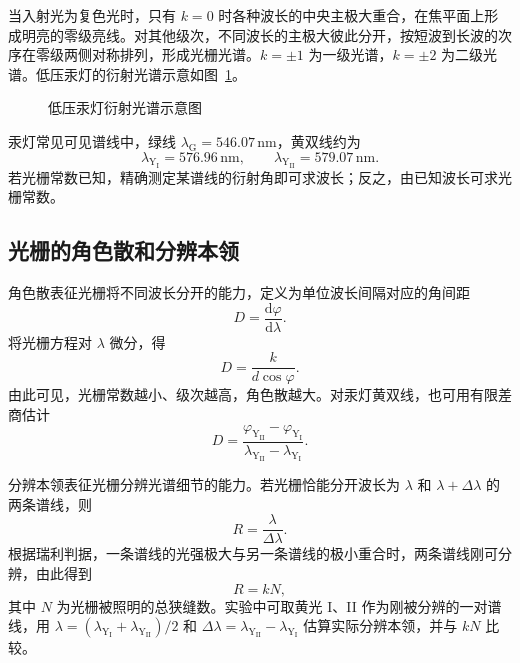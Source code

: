 \documentclass{../template/myrpt}
\begin{document}
当入射光为复色光时，只有 $k=0$ 时各种波长的中央主极大重合，在焦平面上形成明亮的零级亮线。对其他级次，不同波长的主极大彼此分开，按短波到长波的次序在零级两侧对称排列，形成光栅光谱。$k=\pm1$ 为一级光谱，$k=\pm2$ 为二级光谱。低压汞灯的衍射光谱示意如图~\ref{fig:mercury-spectrum}。

\begin{figure}[!htbp]
  \centering
  
  \caption{低压汞灯衍射光谱示意图}
  \label{fig:mercury-spectrum}
\end{figure}

汞灯常见可见谱线中，绿线 $\lambda_{\mathrm{G}}=546.07\,\si{\nano\metre}$，黄双线约为
\[
  \lambda_{\mathrm{Y_I}}=576.96\,\si{\nano\metre},\qquad
  \lambda_{\mathrm{Y_{II}}}=579.07\,\si{\nano\metre}.
\]
若光栅常数已知，精确测定某谱线的衍射角即可求波长；反之，由已知波长可求光栅常数。

\subsection{光栅的角色散和分辨本领}

角色散表征光栅将不同波长分开的能力，定义为单位波长间隔对应的角间距
\begin{equation}
  \label{eq:angular-dispersion-def}
  D=\frac{\mathrm{d}\varphi}{\mathrm{d}\lambda}.
\end{equation}
将光栅方程对 $\lambda$ 微分，得
\begin{equation}
  \label{eq:angular-dispersion}
  D=\frac{k}{d\cos\varphi}.
\end{equation}
由此可见，光栅常数越小、级次越高，角色散越大。对汞灯黄双线，也可用有限差商估计
\begin{equation}
  \label{eq:angular-dispersion-finite}
  D=\frac{\varphi_{\mathrm{Y_{II}}}-\varphi_{\mathrm{Y_I}}}{\lambda_{\mathrm{Y_{II}}}-\lambda_{\mathrm{Y_I}}}.
\end{equation}

分辨本领表征光栅分辨光谱细节的能力。若光栅恰能分开波长为 $\lambda$ 和 $\lambda+\Delta\lambda$ 的两条谱线，则
\begin{equation}
  \label{eq:resolving-power-def}
  R=\frac{\lambda}{\Delta\lambda}.
\end{equation}
根据瑞利判据，一条谱线的光强极大与另一条谱线的极小重合时，两条谱线刚可分辨，由此得到
\begin{equation}
  \label{eq:resolving-power}
  R=kN,
\end{equation}
其中 $N$ 为光栅被照明的总狭缝数。实验中可取黄光 I、II 作为刚被分辨的一对谱线，用 $\lambda=(\lambda_{\mathrm{Y_I}}+\lambda_{\mathrm{Y_{II}}})/2$ 和 $\Delta\lambda=\lambda_{\mathrm{Y_{II}}}-\lambda_{\mathrm{Y_I}}$ 估算实际分辨本领，并与 $kN$ 比较。
\end{document}
